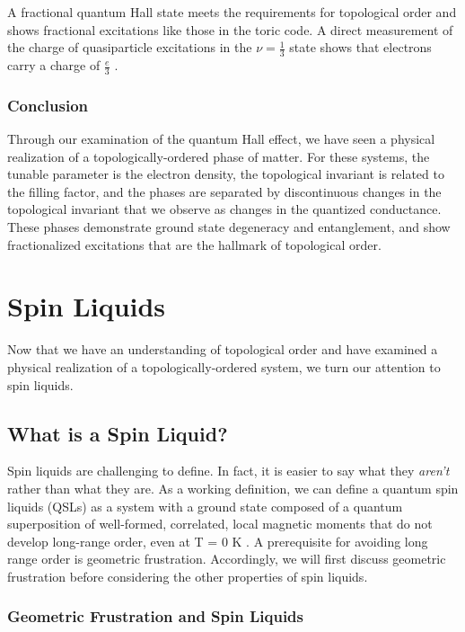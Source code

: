 A fractional quantum Hall state meets the requirements for topological order and shows fractional excitations like those in the toric code. A direct measurement of the charge of quasiparticle excitations in the $\nu=\frac{1}{3}$ state shows that electrons carry a charge of $\frac{e}{3}$ \cite{Goldman1995}.

\subsubsection{Conclusion}

Through our examination of the quantum Hall effect, we have seen a physical realization of a topologically-ordered phase of matter.  For these systems, the tunable parameter is the electron density, the topological invariant is related to the filling factor, and the phases are separated by discontinuous changes in the topological invariant that we observe as changes in the quantized conductance. These phases demonstrate ground state degeneracy and entanglement, and show fractionalized excitations that are the hallmark of topological order.

\section{Spin Liquids}

Now that we have an understanding of topological order and have examined a physical realization of a topologically-ordered system, we turn our attention to spin liquids.

\subsection{What is a Spin Liquid?}

Spin liquids are challenging to define. In fact, it is easier to say what they \textit{aren't} rather than what they are. As a working definition, we can define a quantum spin liquids (QSLs) as a system with a ground state composed of a quantum superposition of well-formed, correlated, local magnetic moments that do not develop long-range order, even at T = 0 K \cite{Balents2010}. A prerequisite for avoiding long range order is geometric frustration. Accordingly, we will first discuss geometric frustration before considering the other properties of spin liquids.

\subsubsection{Geometric Frustration and Spin Liquids}

